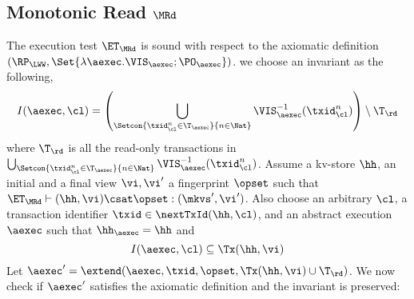 \subsection{Monotonic Read \( \MRd \)}
\label{sec:sound-complete-mr}

The execution test $\ET_\MRd$ is sound with respect to the axiomatic definition $(\RP_{\LWW}, \Set{\lambda \aexec. \VIS_{\aexec} ; \PO_{\aexec} })$. 
we choose an invariant as the following,  
\[
    I(\aexec, \cl) = \left( \bigcup_{\Setcon{\txid_{\cl}^{n} \in \T_{\aexec} }{ n \in \Nat}} \VIS_{\aexec}^{-1}(\txid^n_\cl) \right) \setminus \T_\rd
\]
where \( \T_\rd \) is all the read-only transactions in 
\( \bigcup_{\Setcon{\txid_{\cl}^{n} \in \T_{\aexec} }{ n \in \Nat}} \VIS_{\aexec}^{-1}(\txid^n_\cl) \).
Assume a kv-store $\hh$, an initial and a final view $\vi, \vi'$  a fingerprint $\opset$ 
such that $\ET_{\MRd} \vdash (\hh, \vi) \csat \opset: (\mkvs',\vi')$. 
Also choose an arbitrary $\cl$, a transaction identifier $\txid \in \nextTxId(\hh, \cl)$, 
and an abstract execution $\aexec$ such that $\hh_{\aexec} = \hh$ and 
\begin{equation}
I(\aexec, \cl) \subseteq \Tx(\hh, \vi)
\label{eq:mr_invariant}
\end{equation}
Let \( \aexec' = \extend(\aexec, \txid, \opset, \Tx(\hh, \vi) \cup \T_\rd) \).
We now check if \( \aexec' \) satisfies the axiomatic definition and the invariant is preserved:
